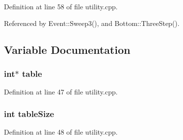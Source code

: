 Definition at line 58 of file utility.cpp.

Referenced by Event::Sweep3(), and Bottom::Three\-Step().

\subsection{Variable Documentation}
\subsubsection{\setlength{\rightskip}{0pt plus 5cm}int$\ast$ {\bf table}}\label{utility_8cpp_a0}




Definition at line 47 of file utility.cpp.
\subsubsection{\setlength{\rightskip}{0pt plus 5cm}int {\bf table\-Size}}\label{utility_8cpp_a1}




Definition at line 48 of file utility.cpp.